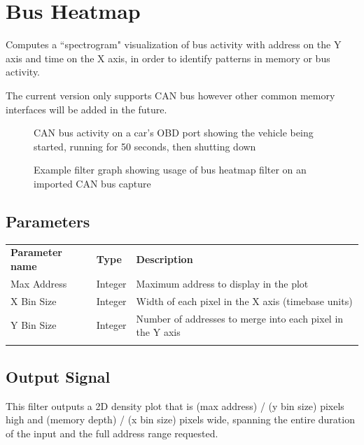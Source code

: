\pagebreak
\section{Bus Heatmap}

Computes a ``spectrogram" visualization of bus activity with address on the Y axis and time on the X axis, in order to
identify patterns in memory or bus activity.

The current version only supports CAN bus however other common memory interfaces will be added in the future.

\begin{figure}[h]
\centering
{}
\caption{CAN bus activity on a car's OBD port showing the vehicle being started, running for 50 seconds, then shutting down}
\label{filter_busheatmap}
\end{figure}

\begin{figure}[h]
\centering
{}
\caption{Example filter graph showing usage of bus heatmap filter on an imported CAN bus capture}
\label{filter_graph_busheatmap}
\end{figure}
\FloatBarrier

\subsection{Parameters}

\begin{tabularx}{16cm}{llX}
\thickhline
\textbf{Parameter name} & \textbf{Type} & \textbf{Description} \\
\thickhline
Max Address & Integer & Maximum address to display in the plot \\
\thinhline
X Bin Size & Integer & Width of each pixel in the X axis (timebase units) \\
\thinhline
Y Bin Size & Integer & Number of addresses to merge into each pixel in the Y axis \\
\thickhline
\end{tabularx}

\subsection{Output Signal}

This filter outputs a 2D density plot that is (max address) / (y bin size) pixels high and (memory depth) / (x bin
size) pixels wide, spanning the entire duration of the input and the full address range requested.

